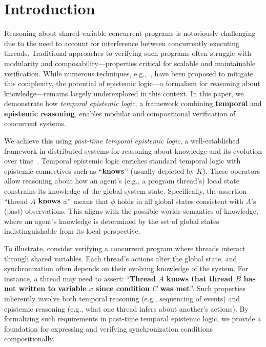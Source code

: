 \section{Introduction}

Reasoning about shared-variable concurrent programs is notoriously challenging due to the need to account for interference between concurrently executing threads. Traditional approaches to verifying such programs often struggle with modularity and composability---properties critical for scalable and maintainable verification. While numerous techniques, e.g.,~\cite{DBLP:journals/iandc/Brookes96,DBLP:conf/amast/Dingel98,DBLP:journals/fac/Dingel02,DBLP:conf/ppdp/Benton0N16,DBLP:journals/corr/abs-1009-2405,DBLP:conf/aplas/DvirKL22,baumann2014ownership,kragl2020verifying}, have been proposed to mitigate this complexity, the potential of epistemic logic---a formalism for reasoning about knowledge---remains largely underexplored in this context. In this paper, we demonstrate how \textit{temporal epistemic logic}, a framework combining \textbf{temporal} and \textbf{epistemic reasoning}, enables modular and compositional verification of concurrent systems.

We achieve this using \textit{past-time temporal epistemic logic}, a well-established framework in distributed systems for reasoning about knowledge and its evolution over time~\cite{DBLP:journals/jacm/AlurHK02,DBLP:conf/podc/HalpernM84,DBLP:conf/focs/Pnueli77,DBLP:conf/pldi/BalliuDG11}. Temporal epistemic logic enriches standard temporal logic with epistemic connectives such as ``$\mathbf{knows}$'' (usually depicted by $K$). These operators allow reasoning about how an agent's (e.g., a program thread's) local state constrains its knowledge of the global system state. Specifically, the assertion ``thread $A$ $\mathbf{knows}$ $\phi$'' means that $\phi$ holds in all global states consistent with $A$'s (past) observations. This aligns with the possible-worlds semantics of knowledge, where an agent's knowledge is determined by the set of global states indistinguishable from its local perspective.


To illustrate, consider verifying a concurrent program where threads interact through shared variables. Each thread's actions alter the global state, and synchronization often depends on their evolving knowledge of the system. For instance, a thread may need to assert: ``\textbf{Thread $A$ knows that thread $B$ has not written to variable $x$ since condition $C$ was met}''. Such properties inherently involve both temporal reasoning (e.g., sequencing of events) and epistemic reasoning (e.g., what one thread infers about another's actions). By formalizing such requirements in past-time temporal epistemic logic, we provide a foundation for expressing and verifying synchronization conditions compositionally.

